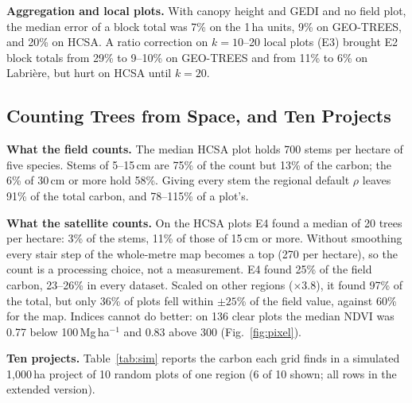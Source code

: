 \documentclass[conference,a4paper]{IEEEtran}
\newcommand{\Mgha}{\,Mg\,ha$^{-1}$}
\begin{document}
\textbf{Aggregation and local plots.} With canopy height and GEDI and no field plot, the median error of a block total was 7\% on the 1\,ha units, 9\% on GEO-TREES, and 20\% on HCSA. A ratio correction on $k=10$--20 local plots (E3) brought E2 block totals from 29\% to 9--10\% on GEO-TREES and from 11\% to 6\% on Labri\`ere, but hurt on HCSA until $k=20$.

\subsection{Counting Trees from Space, and Ten Projects}
\textbf{What the field counts.} The median HCSA plot holds 700 stems per hectare of five species. Stems of 5--15\,cm are 75\% of the count but 13\% of the carbon; the 6\% of 30\,cm or more hold 58\%. Giving every stem the regional default $\rho$ leaves 91\% of the total carbon, and 78--115\% of a plot's.

\textbf{What the satellite counts.} On the HCSA plots E4 found a median of 20 trees per hectare: 3\% of the stems, 11\% of those of 15\,cm or more. Without smoothing every stair step of the whole-metre map becomes a top (270 per hectare), so the count is a processing choice, not a measurement. E4 found 25\% of the field carbon, 23--26\% in every dataset. Scaled on other regions ($\times$3.8), it found 97\% of the total, but only 36\% of plots fell within $\pm25$\% of the field value, against 60\% for the map. Indices cannot do better: on 136 clear plots the median NDVI was 0.77 below 100\Mgha{} and 0.83 above 300 (Fig.~\ref{fig:pixel}).

\textbf{Ten projects.} Table~\ref{tab:sim} reports the carbon each grid finds in a simulated 1{,}000\,ha project of 10 random plots of one region (6 of 10 shown; all rows in the extended version).
\end{document}
